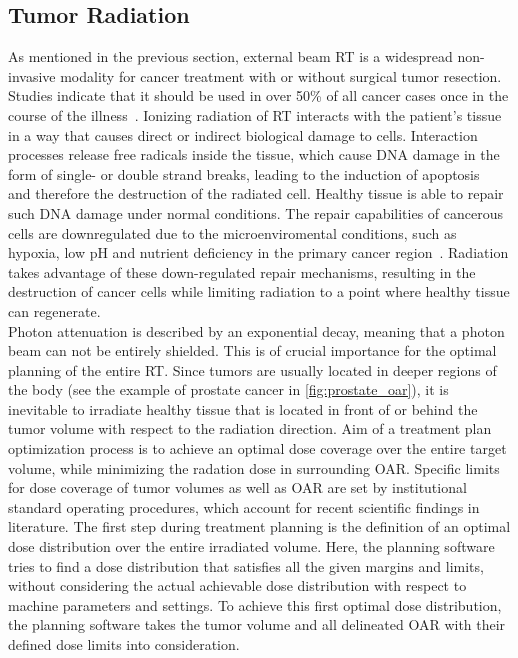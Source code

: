 \subsection{Tumor Radiation}

As mentioned in the previous section, external beam \acs{RT} is a widespread non-invasive modality for cancer treatment with or without surgical tumor resection.
Studies indicate that it should be used in over 50\% of all cancer cases once in the course of the illness~\cite{delaney_role_2005}. 
Ionizing radiation of \ac{RT} interacts with the patient's tissue in a way that causes direct or indirect biological damage to cells.
Interaction processes release free radicals inside the tissue, which cause \ac{DNA} damage in the form of single- or double strand breaks, leading to the induction of apoptosis~\cite{kaina_dna_2003} and therefore the destruction of the radiated cell.
Healthy tissue is able to repair such \acs{DNA} damage under normal conditions. 
The repair capabilities of cancerous cells are downregulated due to the microenviromental conditions, such as hypoxia, low pH and nutrient deficiency in the primary cancer region~\cite{li_dna_2021}.
Radiation takes advantage of these down-regulated repair mechanisms, resulting in the destruction of cancer cells while limiting radiation to a point where healthy tissue can regenerate.\\
Photon attenuation is described by an exponential decay, meaning that a photon beam can not be entirely shielded.
This is of crucial importance for the optimal planning of the entire \ac{RT}.
Since tumors are usually located in deeper regions of the body (see the example of prostate cancer in \autoref{fig:prostate_oar}), it is inevitable to irradiate healthy tissue that is located in front of or behind the tumor volume with respect to the radiation direction. 
Aim of a treatment plan optimization process is to achieve an optimal dose coverage over the entire target volume, while minimizing the radation dose in surrounding \acs{OAR}.
Specific limits for dose coverage of tumor volumes as well as \acs{OAR} are set by institutional standard operating procedures, which account for recent scientific findings in literature.
The first step during treatment planning is the definition of an optimal dose distribution over the entire irradiated volume.
Here, the planning software tries to find a dose distribution that satisfies all the given margins and limits, without considering the actual achievable dose distribution with respect to machine parameters and settings.
To achieve this first optimal dose distribution, the planning software takes the tumor volume and all delineated \acs{OAR} with their defined dose limits into consideration.
